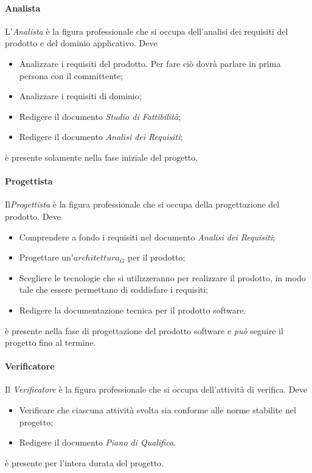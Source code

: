 		\paragraph{Analista} \Spazio
		L'\emph{Analista} è la figura professionale che si occupa dell'analisi dei requisiti del prodotto e del dominio applicativo. Deve
		\begin{itemize}
			\item Analizzare i requisiti del prodotto. Per fare ciò dovrà parlare in prima persona con il committente;
			\item Analizzare i requisiti di dominio;
			\item Redigere il documento \emph{Studio di Fattibilità};
			\item Redigere il documento \emph{Analisi dei Requisiti};
		\end{itemize}
		è presente solamente nella fase iniziale del progetto.
		\paragraph{Progettista} \Spazio
		Il\emph{Progettista} è la figura professionale che si occupa della progettazione del prodotto. Deve
		\begin{itemize}
			\item Comprendere a fondo i requisiti nel documento \emph{Analisi dei Requisiti};
			\item Progettare un'$architettura_G$ per il prodotto;
			\item Scegliere le tecnologie che si utilizzeranno per realizzare il prodotto, in modo tale che essere permettano di soddisfare i requisiti;
			\item Redigere la documentazione tecnica per il prodotto software.
		\end{itemize}
		è presente nella fase di progettazione del prodotto software e \emph{può} seguire il progetto fino al termine.
		\paragraph{Verificatore} \Spazio
		Il \emph{Verificatore} è la figura professionale che si occupa dell'attività di verifica. Deve
		\begin{itemize}
			\item Verificare che ciascuna attività svolta sia conforme alle norme stabilite nel progetto;
			\item Redigere il documento \emph{Piano di Qualifica}.
		\end{itemize}
		è presente per l'intera durata del progetto.
